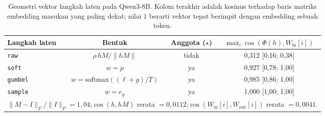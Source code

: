 \begin{table}[htbp]
\centering
\caption{Geometri vektor langkah laten pada Qwen3-8B. Kolom terakhir adalah kosinus terhadap baris matriks embedding masukan yang paling dekat; nilai $1$ berarti vektor tepat berimpit dengan embedding sebuah token.}
\label{tab:geometri}
\small
\begin{tabular}{lccc}
\hline
Langkah laten & Bentuk & Anggota ($\star$) & $\max_i \cos(\Phi(h), W_{\text{in}}[i])$ \\
\hline
\texttt{raw} & $\rho\,hM/\lVert hM\rVert$ & tidak & 0,312 [0,16; 0,38] \\
\texttt{soft} & $w = p$ & ya & 0,927 [0,78; 1,00] \\
\texttt{gumbel} & $w = \mathrm{softmax}((\ell+g)/T)$ & ya & 0,985 [0,86; 1,00] \\
\texttt{sample} & $w = e_y$ & ya & 1,000 [1,00; 1,00] \\
\hline
\multicolumn{4}{l}{\footnotesize $\lVert M-I\rVert_F/\lVert I\rVert_F = 1,04$;\quad $\cos(h, hM)$ rerata $= 0,0112$;\quad $\cos(W_{\text{in}}[i], W_{\text{out}}[i])$ rerata $= 0,0041$.} \\
\end{tabular}
\end{table}
